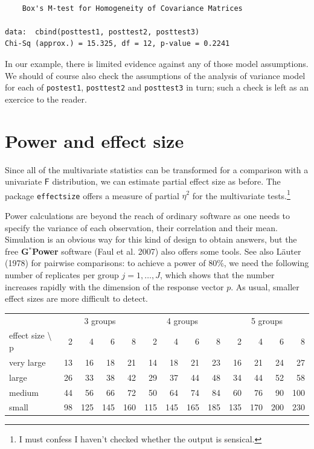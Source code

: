 \documentclass[
  11pt,
  letterpaper,
]{scrbook}
\theoremstyle{definition}
\theoremstyle{definition}
\theoremstyle{remark}
\begin{document}
\begin{verbatim}

    Box's M-test for Homogeneity of Covariance Matrices

data:  cbind(posttest1, posttest2, posttest3)
Chi-Sq (approx.) = 15.325, df = 12, p-value = 0.2241
\end{verbatim}

In our example, there is limited evidence against any of those model
assumptions. We should of course also check the assumptions of the
analysis of variance model for each of \texttt{postest1},
\texttt{posttest2} and \texttt{posttest3} in turn; such a check is left
as an exercice to the reader.

\section{Power and effect size}\label{power-and-effect-size}

Since all of the multivariate statistics can be transformed for a
comparison with a univariate \(\mathsf{F}\) distribution, we can
estimate partial effect size as before. The package \texttt{effectsize}
offers a measure of partial \(\widehat{\eta}^2\) for the multivariate
tests.\footnote{I must confess I haven't checked whether the output is
  sensical.}

Power calculations are beyond the reach of ordinary software as one
needs to specify the variance of each observation, their correlation and
their mean. Simulation is an obvious way for this kind of design to
obtain answers, but the free \textbf{G}\({}^{*}\)\textbf{Power} software
(Faul et al. 2007) also offers some tools. See also Läuter (1978) for
pairwise comparisons: to achieve a power of 80\%, we need the following
number of replicates per group \(j=1, \ldots, J\), which shows that the
number increases rapidly with the dimension of the response vector
\(p\). As usual, smaller effect sizes are more difficult to detect.

\begin{table}
\centering
\begin{tabular}[t]{l|r|r|r|r|r|r|r|r|r|r|r|r}
\hline
\multicolumn{1}{c|}{ } & \multicolumn{4}{c|}{3 groups} & \multicolumn{4}{c|}{4 groups} & \multicolumn{4}{c}{5 groups} \\
\cline{2-5} \cline{6-9} \cline{10-13}
effect size \textbackslash{} p & 2 & 4 & 6 & 8 & 2 & 4 & 6 & 8 & 2 & 4 & 6 & 8\\
\hline
very large & 13 & 16 & 18 & 21 & 14 & 18 & 21 & 23 & 16 & 21 & 24 & 27\\
\hline
large & 26 & 33 & 38 & 42 & 29 & 37 & 44 & 48 & 34 & 44 & 52 & 58\\
\hline
medium & 44 & 56 & 66 & 72 & 50 & 64 & 74 & 84 & 60 & 76 & 90 & 100\\
\hline
small & 98 & 125 & 145 & 160 & 115 & 145 & 165 & 185 & 135 & 170 & 200 & 230\\
\hline
\end{tabular}
\end{table}
\end{document}
